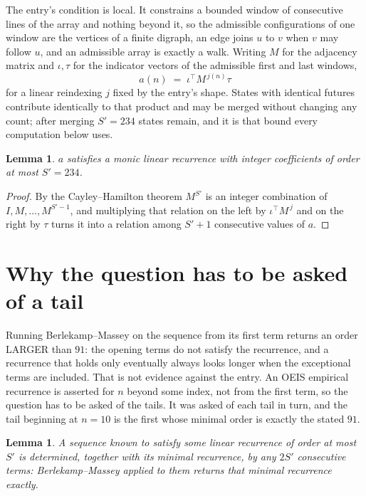\documentclass[11pt,a4paper]{article}
\theoremstyle{plain}
\newtheorem{lemma}[theorem]{Lemma}
\theoremstyle{definition}
\begin{document}
The entry's condition is local. It constrains a bounded window of consecutive lines of the
array and nothing beyond it, so the admissible configurations of one window are the vertices of
a finite digraph, an edge joins $u$ to $v$ when $v$ may follow $u$, and an admissible array is
exactly a walk. Writing $M$ for the adjacency matrix and $\iota,\tau$ for the indicator vectors
of the admissible first and last windows,
\[
a(n)\;=\;\iota^{\!\top}M^{\,j(n)}\tau
\]
for a linear reindexing $j$ fixed by the entry's shape. States with identical futures
contribute identically to that product and may be merged without changing any count; after
merging $S'=234$ states remain, and it is that bound every computation below uses.

\begin{lemma}\label{lem:cf}
$a$ satisfies a monic linear recurrence with integer coefficients of order at most $S'=234$.
\end{lemma}

\begin{proof}
By the Cayley--Hamilton theorem $M^{S'}$ is an integer combination of $I,M,\dots,M^{S'-1}$,
and multiplying that relation on the left by $\iota^{\!\top}M^{\,j}$ and on the right by
$\tau$ turns it into a relation among $S'+1$ consecutive values of $a$.
\end{proof}

\section{Why the question has to be asked of a tail}

Running Berlekamp--Massey on the sequence from its first term returns an order LARGER than $91$: the opening terms do not satisfy the recurrence, and a recurrence that holds only eventually always looks longer when the exceptional terms are included. That is not evidence against the entry. An OEIS empirical recurrence is asserted for $n$ beyond some index, not from the first term, so the question has to be asked of the tails. It was asked of each tail in turn, and the tail beginning at $n=10$ is the first whose minimal order is exactly the stated $91$.

\begin{lemma}\label{lem:bm}
A sequence known to satisfy some linear recurrence of order at most $S'$ is determined,
together with its minimal recurrence, by any $2S'$ consecutive terms: Berlekamp--Massey applied
to them returns that minimal recurrence exactly.
\end{lemma}
\end{document}
